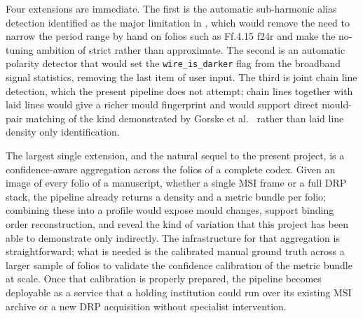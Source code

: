 Four extensions are immediate. The first is the automatic
sub-harmonic alias detection identified as the major limitation in
, which would remove the need to
narrow the period range by hand on folios such as Ff.4.15 f24r and
make the no-tuning ambition of  strict
rather than approximate. The second is an automatic polarity
detector that would set the \texttt{wire\_is\_darker} flag from
the broadband signal statistics, removing the last item of user input. 
The third is joint chain line detection, which the present
pipeline does not attempt; chain lines together with laid lines
would give a richer mould fingerprint and would support direct
mould-pair matching of the kind demonstrated by Gorske et
al.~\cite{gorske2021moldmate} rather than laid line density only
identification.

The largest single extension, and the natural sequel to the
present project, is a confidence-aware aggregation across the
folios of a complete codex. Given an image of every
folio of a manuscript, whether a single MSI frame or a full
DRP stack, the pipeline already returns a density and a metric
bundle per folio; combining these into a profile would
expose mould changes, support binding order
reconstruction, and reveal the kind of variation that
this project has been able to demonstrate only indirectly. The
infrastructure for that aggregation is straightforward; what is
needed is the calibrated manual ground truth across a larger
sample of folios to validate the confidence calibration of the
metric bundle at scale. Once that calibration is properly prepared, the
pipeline becomes deployable as a service that a holding institution
could run over its existing MSI archive or a new DRP acquisition
without specialist intervention.
